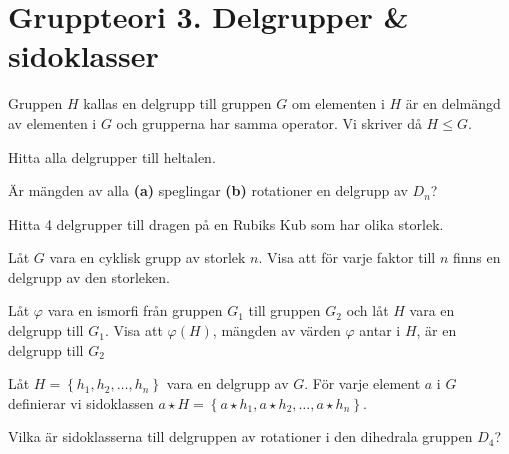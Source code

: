 \documentclass[11pt,fleqn]{book} %
\begin{document}
\renewcommand*\rmdefault{ppl}\normalfont\upshape

\chapter{Gruppteori 3. Delgrupper \& sidoklasser}
\large
\thispagestyle{empty}



\begin{definition} Gruppen \(H\) kallas en delgrupp till gruppen \(G\) om elementen i \(H\) är en delmängd av elementen i \(G\) och grupperna har samma operator. Vi skriver då \(H \leq G\).
\end{definition} %

\begin{problem} Hitta alla delgrupper till heltalen.
\end{problem}

\begin{problem}
  Är mängden av alla \textbf{(a)} speglingar \textbf{(b)} rotationer en delgrupp av \(D_n\)?
\end{problem}

\begin{problem}
  Hitta 4 delgrupper till dragen på en Rubiks Kub som har olika storlek.
\end{problem}

\begin{problem}
  Låt \(G\) vara en cyklisk grupp av storlek \(n\). Visa att för varje faktor till \(n\) finns en delgrupp av den storleken.
\end{problem}

\begin{problem}
  Låt \(\varphi\) vara en ismorfi från gruppen \(G_1\) till gruppen \(G_2\) och låt \(H\) vara en delgrupp till \(G_1\). Visa att \(\varphi (H)\), mängden av värden \(\varphi\) antar i \(H\), är en delgrupp till \(G_2\) 
\end{problem}

\begin{definition} Låt \(H = \left\{h_1, h_2, \dots, h_n\right\}\) vara en delgrupp av \(G\). För varje element \(a\) i \(G\) definierar vi sidoklassen \(a \star H = \left\{a  \star h_1, a \star h_2, \dots, a \star h_n\right\}\).
\end{definition}

\begin{problem}
  Vilka är sidoklasserna till delgruppen av rotationer i den dihedrala gruppen \(D_4\)?
\end{problem}
\end{document}
